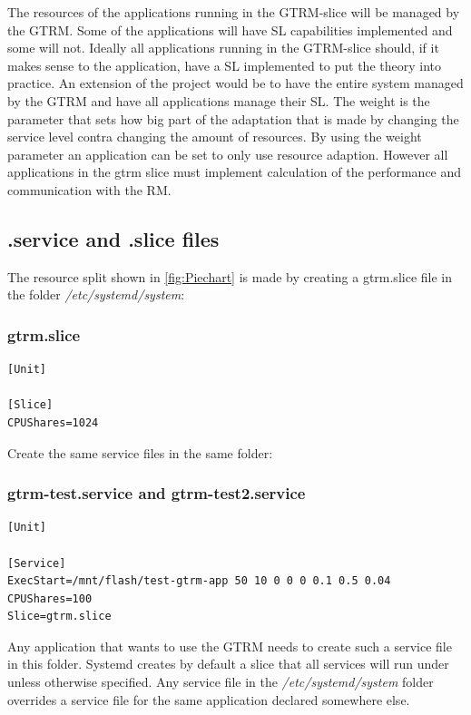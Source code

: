 \documentclass[nobiblatex]{LTHthesis}
\begin{document}
The resources of the applications running in the GTRM-slice will be managed by the GTRM. Some of the applications will have SL capabilities implemented and some will not. Ideally all applications running in the GTRM-slice should, if it makes sense to the application, have a SL implemented to put the theory into practice. An extension of the project would be to have the entire system managed by the GTRM and have all applications manage their SL. The weight is the parameter that sets how big part of the adaptation that is made by changing the service level contra changing the amount of resources. By using the weight parameter an application can be set to only use resource adaption. However all applications in the gtrm slice must implement calculation of the performance and communication with the RM.


\subsection{.service and .slice files}
The resource split shown in \ref{fig:Piechart} is made by creating a gtrm.slice file in the folder \emph{/etc/systemd/system}:
\subsubsection{gtrm.slice}
\begin{verbatim}
[Unit]

[Slice]
CPUShares=1024
\end{verbatim}
Create the same service files in the same folder:
\subsubsection{gtrm-test.service and gtrm-test2.service}
\begin{verbatim}
[Unit]

[Service]
ExecStart=/mnt/flash/test-gtrm-app 50 10 0 0 0 0.1 0.5 0.04
CPUShares=100
Slice=gtrm.slice
\end{verbatim}

Any application that wants to use the GTRM needs to create such a service file in this folder.
Systemd creates by default a slice that all services will run under unless otherwise specified. Any service file in the \emph{/etc/systemd/system} folder overrides a service file for the 
same application declared somewhere else.
\end{document}
